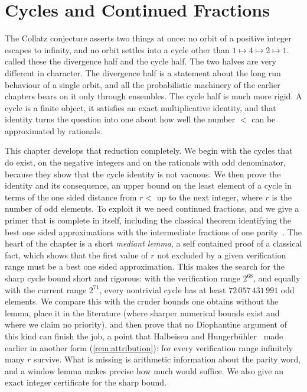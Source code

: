 \chapter{Cycles and Continued Fractions}\label{chap:cycles}

The Collatz conjecture asserts two things at once: no orbit of a positive
integer escapes to infinity, and no orbit settles into a cycle other than
$1\mapsto4\mapsto2\mapsto1$.  called these the divergence
half and the cycle half. The two halves are very different in character. The
divergence half is a statement about the long run behaviour of a single
orbit, and all the probabilistic machinery of the earlier chapters bears on it
only through ensembles. The cycle half is much more rigid. A cycle is a finite
object, it satisfies an exact multiplicative identity, and that identity turns
the question into one about how well the number $\lt$ can be approximated by
rationals.

This chapter develops that reduction completely. We begin with the cycles that
do exist, on the negative integers and on the rationals with odd denominator,
because they show that the cycle identity is not vacuous. We then prove the
identity and its consequence, an upper bound on the least element of a cycle
in terms of the one sided distance from $r\lt$ up to the next integer, where
$r$ is the number of odd elements. To exploit it we need continued fractions,
and we give a primer that is complete in itself, including the classical
theorem identifying the best one sided approximations with the intermediate
fractions of one parity~\cite[Theorem~4.5(ii)]{hancl2019}. The heart of the chapter is a short \emph{mediant
lemma}, a self contained proof of a classical fact, which shows that the first value of $r$ not excluded
by a given verification range must be a best one sided approximation. This
makes the search for the sharp cycle bound short and rigorous: with the
verification range $2^{68}$, and equally with the current range $2^{71}$, every nontrivial cycle has at least
$72\,057\,431\,991$ odd elements. We compare this with the cruder bounds one
obtains without the lemma, place it in the literature (where sharper
numerical bounds exist and where we claim no priority), and then prove that
no Diophantine argument of this kind can finish the job, a point that Halbeisen and Hungerb\"uhler~\cite[\S5]{halbeisen1997} made earlier in another form (\cref{rem:attribution}): for every
verification range infinitely many $r$ survive. What is missing is arithmetic
information about the parity word, and a window lemma makes precise how much
would suffice. We also give an exact integer certificate for the sharp bound.

